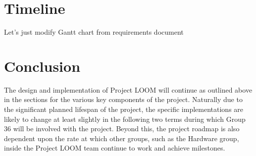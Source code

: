 \documentclass[onecolumn, draftclsnofoot,10pt, compsoc]{IEEEtran}
\begin{document}
\section{Timeline}
Let's just modify Gantt chart from requirements document





\section{Conclusion}
The design and implementation of Project LOOM will continue as outlined above in the sections for the various key components of the project. Naturally due to the significant planned lifespan of the project, the specific implementations are likely to change at least slightly in the following two terms during which Group 36 will be involved with the project. Beyond this, the project roadmap is also dependent upon the rate at which other groups, such as the Hardware group, inside the Project LOOM team continue to work and achieve milestones. 





\end{document}
